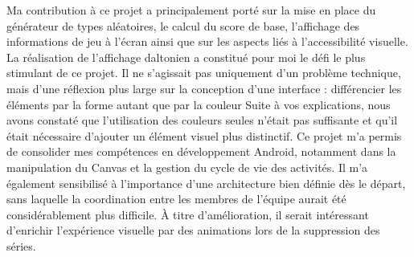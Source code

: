\documentclass[a4paper,12pt]{article}
\begin{document}
Ma contribution à ce projet a principalement porté sur la mise en place du générateur
de types aléatoires, le calcul du score de base, l'affichage des informations de jeu
à l'écran ainsi que sur les aspects liés à l'accessibilité visuelle.
La réalisation de l'affichage daltonien a constitué pour moi le défi le plus stimulant
de ce projet. Il ne s'agissait pas uniquement d'un problème technique, mais d'une
réflexion plus large sur la conception d'une interface : différencier les
éléments par la forme autant que par la couleur Suite à vos explications, nous avons constaté que l’utilisation des couleurs seules n’était pas suffisante et qu’il était nécessaire d’ajouter un élément visuel plus distinctif.
Ce projet m'a permis de consolider mes compétences en développement Android,
notamment dans la manipulation du Canvas et la gestion du cycle de vie des activités.
Il m'a également sensibilisé à l'importance d'une architecture bien définie dès le
départ, sans laquelle la coordination entre les membres de l'équipe aurait été
considérablement plus difficile.
À titre d'amélioration, il serait intéressant d'enrichir l'expérience visuelle par
des animations lors de la suppression des séries.
\end{document}
